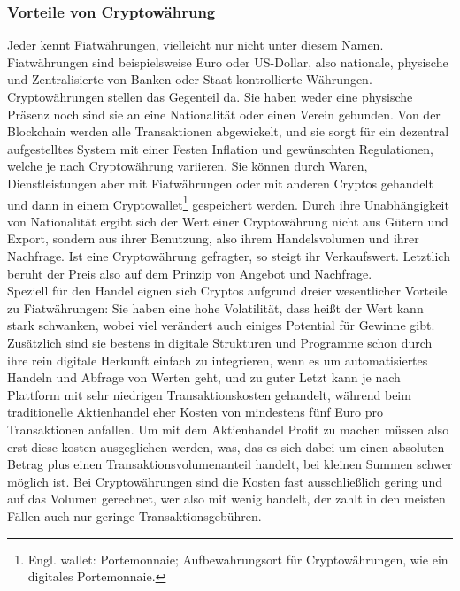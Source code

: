 \documentclass[12pt]{article}
\begin{document}
	\subsubsection{Vorteile von Cryptowährung}
		Jeder kennt Fiatwährungen, vielleicht nur nicht unter diesem Namen. Fiatwährungen sind beispielsweise Euro oder US-Dollar, also nationale, physische und Zentralisierte von Banken oder Staat kontrollierte Währungen. Cryptowährungen stellen das Gegenteil da. Sie haben weder eine physische Präsenz noch sind sie an eine Nationalität oder einen Verein gebunden. Von der Blockchain werden alle Transaktionen abgewickelt, und sie sorgt für ein dezentral aufgestelltes System mit einer Festen Inflation und gewünschten Regulationen, welche je nach Cryptowährung variieren. Sie können durch Waren, Dienstleistungen aber mit Fiatwährungen oder mit anderen Cryptos gehandelt und dann in einem Cryptowallet\footnote{Engl. wallet: Portemonnaie; Aufbewahrungsort für Cryptowährungen, wie ein digitales Portemonnaie.} gespeichert werden. Durch ihre Unabhängigkeit von Nationalität ergibt sich der Wert einer Cryptowährung nicht aus Gütern und Export, sondern aus ihrer Benutzung, also ihrem Handelsvolumen und ihrer Nachfrage. Ist eine Cryptowährung gefragter, so steigt ihr Verkaufswert. Letztlich beruht der Preis also auf dem Prinzip von Angebot und Nachfrage.\\
		Speziell für den Handel eignen sich Cryptos aufgrund dreier wesentlicher Vorteile zu Fiatwährungen: Sie haben eine hohe Volatilität, dass heißt der Wert kann stark schwanken, wobei viel verändert auch einiges Potential für Gewinne gibt. Zusätzlich sind sie bestens in digitale Strukturen und Programme schon durch ihre rein digitale Herkunft einfach zu integrieren, wenn es um automatisiertes Handeln und Abfrage von Werten geht, und zu guter Letzt kann je nach Plattform mit sehr niedrigen Transaktionskosten gehandelt, während beim traditionelle Aktienhandel eher Kosten von mindestens fünf Euro pro Transaktionen anfallen. Um mit dem Aktienhandel Profit zu machen müssen also erst diese kosten ausgeglichen werden, was, das es sich dabei um einen absoluten Betrag plus einen Transaktionsvolumenanteil handelt, bei kleinen Summen schwer möglich ist. Bei Cryptowährungen sind die Kosten fast ausschließlich gering und auf das Volumen gerechnet, wer also mit wenig handelt, der zahlt in den meisten Fällen auch nur geringe Transaktionsgebühren.
\end{document}
